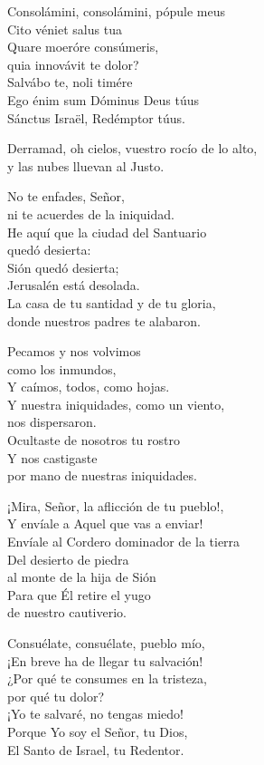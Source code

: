 Consolámini, consolámini, pópule meus\\ Cito véniet salus tua\\ Quare moeróre consúmeris,\\ quia innovávit te dolor?\\ Salvábo te, noli timére\\ Ego énim sum Dóminus Deus túus\\ Sánctus Israël, Redémptor túus.\strut



Derramad, oh cielos, vuestro rocío de lo alto,\\ y las nubes lluevan al Justo.

No te enfades, Señor,\\ ni te acuerdes de la iniquidad.\\ He aquí que la ciudad del Santuario\\ quedó desierta:\\ Sión quedó desierta;\\ Jerusalén está desolada.\\ La casa de tu santidad y de tu gloria,\\ donde nuestros padres te alabaron.

Pecamos y nos volvimos\\ como los inmundos,\\ Y caímos, todos, como hojas.\\ Y nuestra iniquidades, como un viento,\\ nos dispersaron.\\ Ocultaste de nosotros tu rostro\\ Y nos castigaste\\ por mano de nuestras iniquidades.

¡Mira, Señor, la aflicción de tu pueblo!,\\ Y envíale a Aquel que vas a enviar!\\ Envíale al Cordero dominador de la tierra\\ Del desierto de piedra\\ al monte de la hija de Sión\\ Para que Él retire el yugo\\ de nuestro cautiverio.

Consuélate, consuélate, pueblo mío,\\ ¡En breve ha de llegar tu salvación!\\ ¿Por qué te consumes en la tristeza,\\ por qué tu dolor?\\ ¡Yo te salvaré, no tengas miedo!\\ Porque Yo soy el Señor, tu Dios,\\ El Santo de Israel, tu Redentor.\strut



